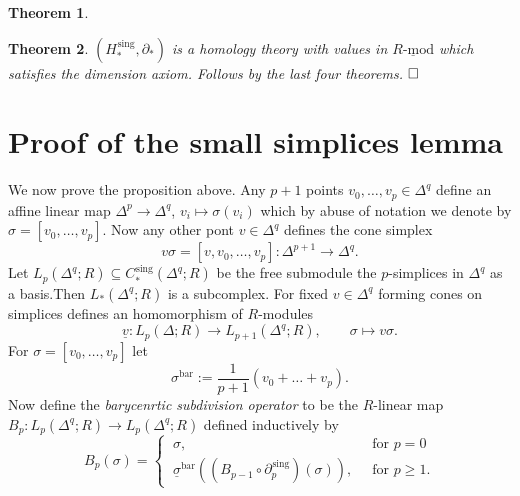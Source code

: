 \documentclass[11pt]{book}
\numberwithin{dummy}{section}
\newtheorem{theorem}{Theorem}[section]
\theoremstyle{nonumberbreak}
\newenvironment{pr}[1][]{\ifthenelse{\equal{#1}{}}{\proof}{\proof[#1]}\rm}{\endproof}
\newcommand{\Rmod}{\underline{R\textrm{-}\mathrm{mod}}}
\newcommand{\la}{\longrightarrow}
\newcommand{\Cs}{C^{\hspace{1pt}\mathrm{sing}}}
\newcommand{\Hs}{H^{\hspace{1pt}\mathrm{sing}}}
\begin{document}
\begin{spacing}{1.4}
\begin{theorem}
\begin{pr}
\end{pr}

\end{theorem}

\begin{theorem}
$(\Hs_*, \partial_*)$ is a homology theory with values in $\Rmod$ which satisfies the dimension axiom.
\begin{pr}
Follows by the last four theorems. $\hfill \Box$
\end{pr}
\end{theorem}





\section{Proof of the small simplices lemma} %


\newcommand{\sbar}{\sigma^{\mathrm{bar}}}

We now prove the proposition above. Any $p+1$ points $v_0, \ldots, v_p \in \Delta^q$ define an affine linear map $\Delta^p \la \Delta^q$, $v_i \mapsto \sigma(v_i)$ which by abuse of notation we denote by $\sigma=[v_0, \ldots, v_p]$. Now any other pont $v \in \Delta^q$ defines the cone simplex
$$v\sigma = [v ,v_0, \ldots, v_p]: \Delta^{p+1} \la \Delta^q.$$
Let $L_p(\Delta^q;R) \subseteq \Cs_*(\Delta^q;R)$ be the free submodule the $p$-simplices in $\Delta^q$ as a basis.Then $L_*(\Delta^q;R)$ is a subcomplex. For fixed $v \in \Delta^q$ forming cones on simplices defines an homomorphism of $R$-modules
$$\underline{v}: L_p(\Delta;R) \la L_{p+1}(\Delta^q;R), \qquad \sigma \mapsto v\sigma.$$
For $\sigma=[v_0, \ldots, v_p]$ let 
$$\sbar := \frac{1}{p+1} (v_0 + \ldots + v_p).$$
Now define the \textit{barycenrtic subdivision operator} to be the $R$-linear map
$B_p: L_p(\Delta^q;R) \la L_p(\Delta^q;R)$
defined inductively by
$$B_p(\sigma) = \begin{cases} \ \sigma, & \ \textrm{ for } p=0 \\ \ \underline{\sigma}^{\mathrm{bar}}\left((B_{p-1} \circ \partial_p^{\hspace{1pt}\mathrm{sing}})(\sigma)\right), & \ \textrm{ for }p\geqslant 1. \end{cases}$$


\end{spacing}
\end{document}

